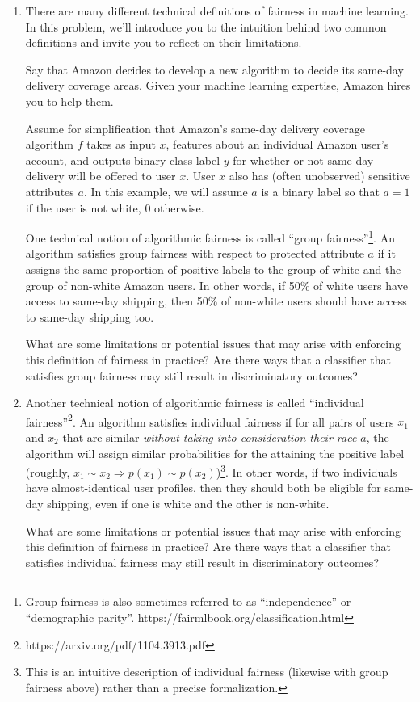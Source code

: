 \documentclass[submit]{harvardml}
\begin{document}
\begin{problem}
\begin{enumerate}
    \item There are many different technical definitions of fairness in machine learning.  In this problem, we'll introduce you to the intuition behind two common definitions and invite you to reflect on their limitations. 
     
    Say that Amazon decides to develop a new algorithm to decide its same-day delivery coverage areas.  Given your machine learning expertise, Amazon hires you to help them.
    
    Assume for simplification that Amazon's same-day delivery coverage algorithm $f$ takes as input $x$, features about an individual Amazon user's account, and outputs binary class label $y$ for whether or not same-day delivery will be offered to user $x$.  User $x$ also has (often unobserved) sensitive attributes $a$.  In this example, we will assume $a$ is a binary label so that $a = 1$ if the user is not white, $0$ otherwise.
    
    One technical notion of algorithmic fairness is called ``group fairness''\footnote{ Group fairness is also sometimes referred to as ``independence'' or ``demographic parity''.  https://fairmlbook.org/classification.html}. An algorithm satisfies group fairness with respect to protected attribute $a$ if it assigns the same proportion of positive labels to the group of white and the group of non-white Amazon users.  In other words, if 50\% of white users have access to same-day shipping, then 50\% of non-white users should have access to same-day shipping too.
    
    What are some limitations or potential issues that may arise with enforcing this definition of fairness in practice?  Are there ways that a classifier that satisfies group fairness may still result in discriminatory outcomes?
    
    \item Another technical notion of algorithmic fairness is called ``individual fairness''\footnote{https://arxiv.org/pdf/1104.3913.pdf}. An algorithm satisfies individual fairness if for all pairs of users $x_1$ and $x_2$ that are similar \emph{without taking into consideration their race $a$}, the algorithm will assign similar probabilities for the attaining the positive label (roughly, $x_1 \sim x_2 \Rightarrow p(x_1) \sim p(x_2)$)\footnote{This is an intuitive description of individual fairness (likewise with group fairness above) rather than a precise formalization.}.  In other words, if two individuals have almost-identical user profiles, then they should both be eligible for same-day shipping, even if one is white and the other is non-white.
    
    What are some limitations or potential issues that may arise with enforcing this definition of fairness in practice?  Are there ways that a classifier that satisfies individual fairness may still result in discriminatory outcomes?
    
\end{enumerate}

\end{problem}
\end{document}
